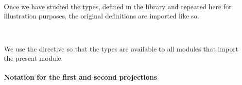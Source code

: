 \begin{code}
\>[1]\AgdaSpace{}%
\AgdaSymbol{:}\AgdaSpace{}%
\AgdaSymbol{(}\AgdaSpace{}%
\AgdaSymbol{:}\AgdaSpace{}%
\AgdaSpace{}%
\AgdaSpace{}%
\AgdaSymbol{)(}\AgdaSpace{}%
\AgdaSymbol{:}\AgdaSpace{}%
\AgdaSpace{}%
\AgdaSpace{}%
\AgdaSpace{}%
\AgdaSpace{}%
\AgdaSymbol{)}\AgdaSpace{}%
\AgdaSpace{}%
\AgdaSpace{}%
\AgdaSpace{}%
\AgdaSpace{}%
\<%
\\
%
\>[1]\AgdaSpace{}%
\AgdaSpace{}%
\AgdaSpace{}%
\AgdaSymbol{=}\AgdaSpace{}%
\AgdaSpace{}%
\<%
\\
%
\\[\AgdaEmptyExtraSkip]%
\>[1]\AgdaSpace{}%
\AgdaSpace{}%
\AgdaSpace{}%
\AgdaSpace{}%
\AgdaSpace{}%
\AgdaSpace{}%
\AgdaSymbol{)}\AgdaSpace{}%
\AgdaSymbol{=}\AgdaSpace{}%
\AgdaSpace{}%
\AgdaSpace{}%
\AgdaSpace{}%
\AgdaSpace{}%
\AgdaFunction{,}\AgdaSpace{}%
\<%
\end{code}
\ccpad
Once we have studied the types, defined in the \typetopology library and repeated here for illustration purposes, the original definitions are imported like so.
\ccpad
\begin{code}%
\>[0]\AgdaSpace{}%
\AgdaSpace{}%
\AgdaSpace{}\<%
\\
\>[0]\AgdaSpace{}%
\AgdaSpace{}%
\AgdaSpace{}%
\AgdaSpace{}%
\AgdaSymbol{(}\AgdaSymbol{;}\AgdaSpace{}%
\AgdaSymbol{;}\AgdaSpace{}%
\AgdaSymbol{;}\AgdaSpace{}%
\AgdaSymbol{;}\AgdaSpace{}%
\AgdaSymbol{;}\AgdaSpace{}%
\AgdaSymbol{)}\<%
\end{code}
\ccpad
We use the  directive so that the types are available to all modules that import the present module.

\paragraph*{Notation for the first and second projections}

